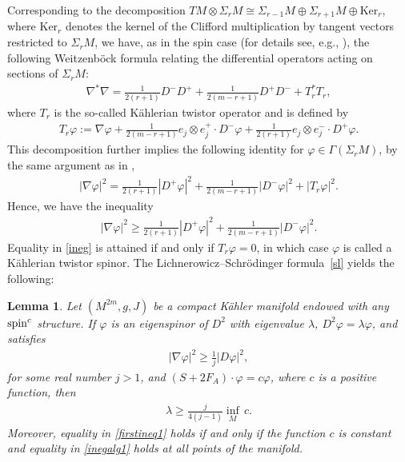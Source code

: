 \documentclass[pdftex]{sigma}
\numberwithin{equation}{section}
\newtheorem{lem}[thm]{Lemma}
\theoremstyle{definition}
\begin{document}
Corresponding to the decomposition $TM\otimes\Sigma_{r}M\cong \Sigma_{r-1}M\oplus \Sigma_{r+1}M\oplus \mathrm{Ker}_r$,
where $\mathrm{Ker}_r$ denotes the kernel of the Clif\/ford multiplication by tangent vectors restricted to $\Sigma_{r}M$, we have, as in the spin case (for details see, e.g., \cite[equation~(2.7)]{pilcapaper}), the following Weitzenb\"ock formula relating the dif\/ferential operators acting on sections of $\Sigma_{r}M$:
\begin{gather*}%
\nabla^{*}\nabla=\frac{1}{2(r+1)}D^-D^+ +\frac{1}{2(m-r+1)}D^+D^- + T_r^*T_r,
\end{gather*}
where $T_r$ is the so-called K\"ahlerian twistor operator and is def\/ined by
\begin{gather*}
T_r\varphi:= \nabla \varphi +\frac{1}{2(m-r+1)}e_j\otimes e_j^+\cdot D^-\varphi+\frac{1}{2(r+1)}e_j\otimes e_j^-\cdot D^+\varphi.
\end{gather*}
This decomposition further implies the following identity for $\varphi\in\Gamma(\Sigma_{r}M)$, by the same argument as in \cite[Lemma 2.5]{pilcapaper},
\begin{gather}\label{ident}
|\nabla\varphi|^2= \frac{1}{2(r+1)}|D^+\varphi|^2 +\frac{1}{2(m-r+1)}|D^-\varphi|^2+|T_r\varphi|^2.
\end{gather}
Hence, we have the inequality
\begin{gather}\label{ineg}
|\nabla\varphi|^2\geq \frac{1}{2(r+1)}|D^+\varphi|^2 +\frac{1}{2(m-r+1)}|D^-\varphi|^2.
\end{gather}
Equality in \eqref{ineg} is attained if and only if $T_r\varphi=0$, in which case $\varphi$ is called a K\"ahlerian twistor spinor. The Lichnerowicz--Schr\"odinger formula~\eqref{sl} yields the following:
\begin{lem}\label{alg1}
Let $(M^{2m},g,J)$ be a compact K\"ahler manifold endowed with any ${\mathop{\rm spin}^c}$ structure.  If $\varphi$ is an eigenspinor of $D^2$ with eigenvalue $\lambda$, $D^2\varphi=\lambda\varphi$, and satisfies
\begin{gather}\label{inegalg1}
|\nabla\varphi|^2\geq\frac{1}{j}|D\varphi|^2,
\end{gather}
for some real number $j>1$, and  $(S +2 F_A) \cdot \varphi = c \varphi$,
where $c$ is a positive function, then
\begin{gather}\label{firstineq1}
\lambda\geq\frac{j}{4(j-1)}\underset{M}{\inf} \, c.
\end{gather}
Moreover, equality in \eqref{firstineq1}  holds if and only if the function $c$ is constant and equality in \eqref{inegalg1} holds at all points of the manifold.
\end{lem}
\end{document}
